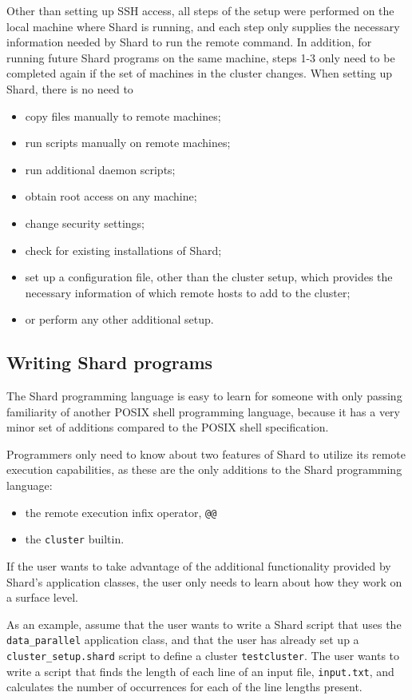 \documentclass[twoside]{report}
\begin{document}
Other than setting up SSH access, all steps of the setup were performed on the local machine where Shard is running, and each step only supplies the necessary information needed by Shard to run the remote command.
In addition, for running future Shard programs on the same machine, steps 1-3 only need to be completed again if the set of machines in the cluster changes.
When setting up Shard, there is no need to
\begin{itemize}
  \item copy files manually to remote machines;
  \item run scripts manually on remote machines;
  \item run additional daemon scripts;
  \item obtain root access on any machine;
  \item change security settings;
  \item check for existing installations of Shard;
  \item set up a configuration file, other than the cluster setup, which provides the necessary information of which remote hosts to add to the cluster;
  \item or perform any other additional setup.
\end{itemize}

\subsection{Writing Shard programs}

The Shard programming language is easy to learn for someone with only passing familiarity of another POSIX shell programming language, because it has a very minor set of additions compared to the POSIX shell specification.

Programmers only need to know about two features of Shard to utilize its remote execution capabilities, as these are the only additions to the Shard programming language:
\begin{itemize}
  \item the remote execution infix operator, \texttt{@@}
  \item the \texttt{cluster} builtin.
\end{itemize}
If the user wants to take advantage of the additional functionality provided by Shard's application classes, the user only needs to learn about how they work on a surface level.

As an example, assume that the user wants to write a Shard script that uses the \texttt{data\_parallel} application class, and that the user has already set up a \texttt{cluster\_setup.shard} script to define a cluster \texttt{testcluster}.
The user wants to write a script that finds the length of each line of an input file, \texttt{input.txt}, and calculates the number of occurrences for each of the line lengths present.
\end{document}
